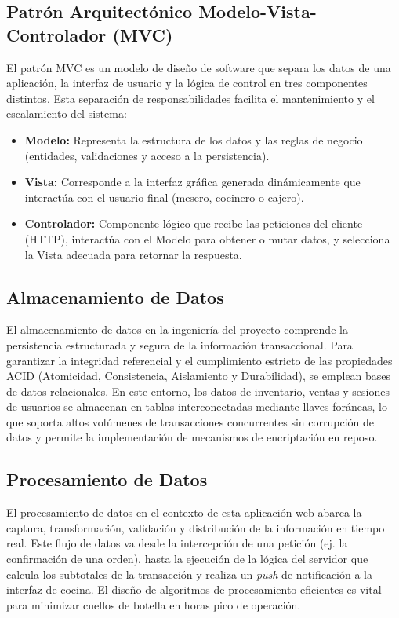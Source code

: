 \subsection{Patrón Arquitectónico Modelo-Vista-Controlador (MVC)}
El patrón MVC es un modelo de diseño de software que separa los datos de una aplicación, la interfaz de usuario y la lógica de control en tres componentes distintos. Esta separación de responsabilidades facilita el mantenimiento y el escalamiento del sistema:
\begin{itemize}
	\item \textbf{Modelo:} Representa la estructura de los datos y las reglas de negocio (entidades, validaciones y acceso a la persistencia).
	\item \textbf{Vista:} Corresponde a la interfaz gráfica generada dinámicamente que interactúa con el usuario final (mesero, cocinero o cajero).
	\item \textbf{Controlador:} Componente lógico que recibe las peticiones del cliente (HTTP), interactúa con el Modelo para obtener o mutar datos, y selecciona la Vista adecuada para retornar la respuesta.
\end{itemize}

\subsection{Almacenamiento de Datos}
El almacenamiento de datos en la ingeniería del proyecto comprende la persistencia estructurada y segura de la información transaccional. Para garantizar la integridad referencial y el cumplimiento estricto de las propiedades ACID (Atomicidad, Consistencia, Aislamiento y Durabilidad), se emplean bases de datos relacionales. En este entorno, los datos de inventario, ventas y sesiones de usuarios se almacenan en tablas interconectadas mediante llaves foráneas, lo que soporta altos volúmenes de transacciones concurrentes sin corrupción de datos y permite la implementación de mecanismos de encriptación en reposo.

\subsection{Procesamiento de Datos}
El procesamiento de datos en el contexto de esta aplicación web abarca la captura, transformación, validación y distribución de la información en tiempo real. Este flujo de datos va desde la intercepción de una petición (ej. la confirmación de una orden), hasta la ejecución de la lógica del servidor que calcula los subtotales de la transacción y realiza un \textit{push} de notificación a la interfaz de cocina. El diseño de algoritmos de procesamiento eficientes es vital para minimizar cuellos de botella en horas pico de operación.

